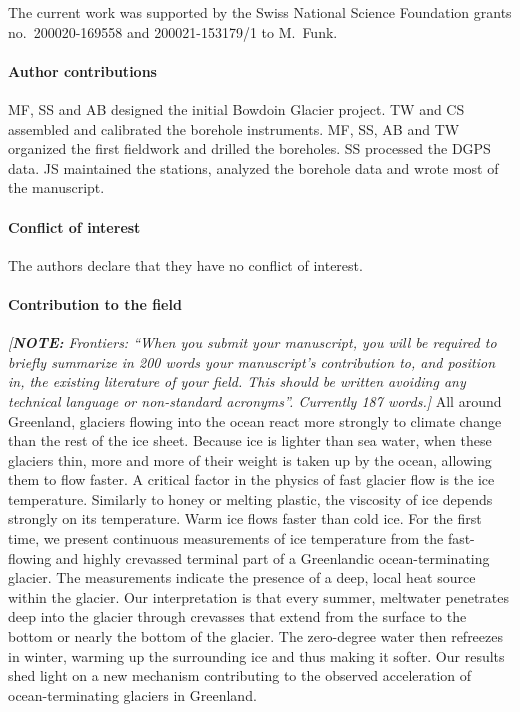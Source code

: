 \documentclass[utf8]{article}
\newcommand{\note}[1]{\textcolor{c0}{\emph{[\textbf{NOTE:} #1]}}}
\begin{document}
    The current work was supported by the Swiss National Science Foundation
    grants no.~200020-169558 and 200021-153179/1 to M.~Funk.

\paragraph{Author contributions}

    MF, SS and AB designed the initial Bowdoin Glacier project.
    TW and CS assembled and calibrated the borehole instruments.
    MF, SS, AB and TW organized the first fieldwork and drilled the boreholes.
    SS processed the DGPS data.
    JS maintained the stations, analyzed the borehole data and wrote most of
    the manuscript.

\paragraph{Conflict of interest}

    The authors declare that they have no conflict of interest.

\paragraph{Contribution to the field}

    \note{Frontiers: ``When you submit your manuscript, you will be required to
          briefly summarize in 200 words your manuscript’s contribution to, and
          position in, the existing literature of your field. This should be
          written avoiding any technical language or non-standard acronyms''.
          Currently 187 words.}
    All around Greenland, glaciers flowing into the ocean react more strongly
    to climate change than the rest of the ice sheet. Because ice is lighter
    than sea water, when these glaciers thin, more and more of their weight is
    taken up by the ocean, allowing them to flow faster. A critical factor in
    the physics of fast glacier flow is the ice temperature. Similarly to honey
    or melting plastic, the viscosity of ice depends strongly on its
    temperature. Warm ice flows faster than cold ice.
    For the first time, we present continuous measurements of ice
    temperature from the fast-flowing and highly crevassed terminal part of a
    Greenlandic ocean-terminating glacier. The measurements indicate the
    presence of a deep, local heat source within the glacier. Our
    interpretation is that every summer, meltwater penetrates deep into the
    glacier through crevasses that extend from the surface to the bottom or
    nearly the bottom of the glacier. The zero-degree water then refreezes in
    winter, warming up the surrounding ice and thus making it softer.
    Our results shed light on a new mechanism contributing to the observed
    acceleration of ocean-terminating glaciers in Greenland.
\end{document}
